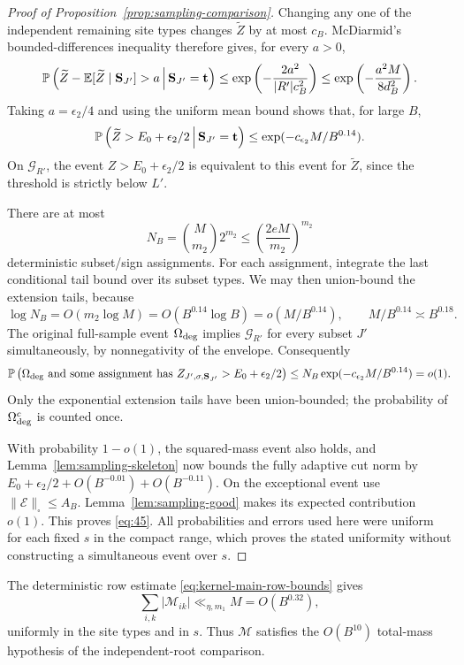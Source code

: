 \begin{proof}[Proof of Proposition~\ref{prop:sampling-comparison}]
Changing any one of the independent remaining site types changes
$\widetilde Z$ by at most $c_B$.  McDiarmid's bounded-differences
inequality \citep{McDiarmid1989} therefore gives, for every $a>0$,
\[
 \mathbb P\left(\widetilde Z-\mathbb E[\widetilde Z\mid\mathbf S_{J'}]
                     >a\,\middle|\,\mathbf S_{J'}=\mathbf t\right)
 \le\exp\left(-\frac{2a^2}{|R'|c_B^2}\right)
 \le\exp\left(-\frac{a^2M}{8d_B^2}\right).
\]
Taking $a=\epsilon_2/4$ and using the uniform mean bound shows
that, for large $B$,
\[
 \mathbb P\left(\widetilde Z>E_0+\epsilon_2/2
                     \,\middle|\,\mathbf S_{J'}=\mathbf t\right)
 \le\exp(-c_{\epsilon_2}M/B^{0.14}).
\]
On $\mathcal G_{R'}$, the event $Z>E_0+\epsilon_2/2$ is
equivalent to this event for $\widetilde Z$, since the threshold
is strictly below $L'$.

There are at most
\[
 N_B=\binom{M}{m_2}2^{m_2}
       \le\left(\frac{2eM}{m_2}\right)^{m_2}
\]
deterministic subset/sign assignments.  For each assignment,
integrate the last conditional tail bound over its subset types.
We may then union-bound the extension tails, because
\[
 \log N_B=O(m_2\log M)=O(B^{0.14}\log B)
       =o(M/B^{0.14}),
 \qquad M/B^{0.14}\asymp B^{0.18}.
\]
The original full-sample event $\Omega_{\rm deg}$ implies
$\mathcal G_{R'}$ for every subset $J'$ simultaneously, by
nonnegativity of the envelope.  Consequently
\[
 \mathbb P\left(\Omega_{\rm deg}\ \text{and some assignment has}
          \ Z_{J',\sigma,\mathbf S_{J'}}>E_0+\epsilon_2/2\right)
 \le N_B\exp(-c_{\epsilon_2}M/B^{0.14})=o(1).
\]
Only the exponential extension tails have been union-bounded;
the probability of $\Omega_{\rm deg}^c$ is counted once.

With probability $1-o(1)$, the squared-mass event also holds,
and Lemma~\ref{lem:sampling-skeleton} now bounds the fully
adaptive cut norm by
$E_0+\epsilon_2/2+O(B^{-0.01})+O(B^{-0.11})$.
On the exceptional event use $\|\mathcal E\|_\square\le A_B$.
Lemma~\ref{lem:sampling-good} makes its expected contribution
$o(1)$.  This proves \eqref{eq:45}.
All probabilities and errors used here were uniform for each
fixed $s$ in the compact range, which proves the stated
uniformity without constructing a simultaneous event over $s$.
\end{proof}

The deterministic row estimate \eqref{eq:kernel-main-row-bounds} gives
\[
 \sum_{i,k}|\mathcal M_{ik}|
 \ll_{\eta,m_1}M=O(B^{0.32}),
\]
uniformly in the site types and in $s$. Thus $\mathcal M$ satisfies the
$O(B^{10})$ total-mass hypothesis of the independent-root comparison.

